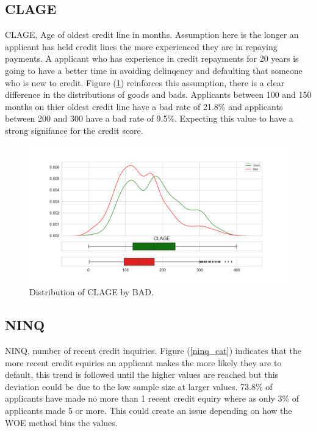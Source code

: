 \subsection*{CLAGE}

CLAGE,  Age of oldest credit line in months. Assumption here is the longer an applicant has held credit lines the more experienced they are in repaying payments. A applicant who has experience in credit repayments for 20 years is going to have a better time in avoiding delinqency and defaulting that someone who is new to credit. Figure (\ref{clage_dist}) reinforces this assumption,  there is a clear difference in the distributions of goods and bads. Applicants between 100 and 150 months on thier oldest credit line have a bad rate of 21.8\% and applicants between 200 and 300 have a bad rate of 9.5\%. Expecting this value to have a strong signifance for the credit score.

\begin{figure}[H]
	\centering
	\includegraphics[scale=0.40]{figs/clage_dist.pdf}
	\caption{Distribution of CLAGE by BAD. \label{clage_dist}}
\end{figure}

\subsection*{NINQ}

NINQ,  number of recent credit inquiries. Figure (\ref{ninq_cat}) indicates that the more recent credit equiries an applicant makes the more likely they are to default,  this trend is followed until the higher values are reached but this deviation could be due to the low sample size at larger values. 73.8\% of applicants have made no more than 1 recent credit equiry where as only 3\% of applicants made 5 or more. This could create an issue depending on how the WOE method bins the values.

